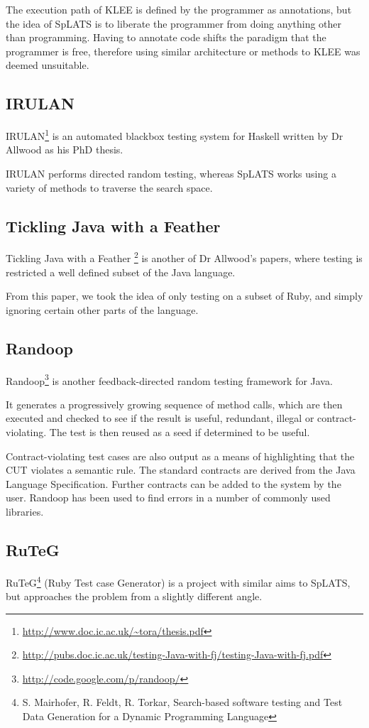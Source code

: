   The execution path of KLEE is defined by the programmer as annotations, but the idea of SpLATS is to liberate the programmer from doing anything other than programming. Having to annotate code shifts the paradigm that the programmer is free, therefore using similar architecture or methods to KLEE was deemed unsuitable.

  \subsection{IRULAN}
    IRULAN\footnote{\url{http://www.doc.ic.ac.uk/~tora/thesis.pdf}} is an 
    automated blackbox testing system for Haskell written by Dr Allwood 
    as his PhD thesis.

    IRULAN performs directed random testing, whereas SpLATS works using a variety 
    of methods to traverse the search space.

  \subsection{Tickling Java with a Feather}
    Tickling Java with a Feather
    \footnote{\url{http://pubs.doc.ic.ac.uk/testing-Java-with-fj/testing-Java-with-fj.pdf}}
    is another of Dr Allwood's papers, where testing is restricted a well defined
    subset of the Java language. 

    From this paper, we took the idea of only testing on a subset of Ruby, and 
    simply ignoring certain other parts of the language.


  \subsection{Randoop}
    Randoop\footnote{\url{http://code.google.com/p/randoop/}} is another
feedback-directed random testing framework for Java.

    It generates a progressively growing sequence of method calls, which are
then executed and checked to see if the result is useful, redundant, illegal or
contract-violating. The test is then reused as a seed if determined to be
useful.

    Contract-violating test cases are also output as a means of highlighting
that the CUT violates a semantic rule. The standard contracts are derived from
the Java Language Specification. Further contracts can be added to the system by
the user. Randoop has been used to find errors in a number of commonly used libraries.

  \subsection{RuTeG}
    RuTeG\footnote{S. Mairhofer, R. Feldt, R. Torkar, Search-based software
testing and Test Data Generation for a Dynamic Programming Language} (Ruby Test
case Generator) is a project with similar aims to SpLATS, but approaches the
problem from a slightly different angle.

